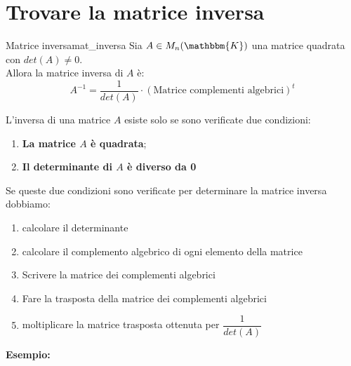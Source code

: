 \documentclass[12pt, letterpaper]{report}
\newcounter{definition}
\newcommand{\nmu}{}
\begin{document}
   		\section{Trovare la matrice inversa}
   		 \begin{definition}{\nmu Matrice inversa}{mat_inversa}
   			Sia $A \in M_n(\mathbbm{K})$ una matrice quadrata con $det(A) \neq 0$. \\
   			Allora la matrice inversa di $A$ è:
   			\[
   			A^{-1} = \dfrac{1}{det(A)} \cdot (\text{Matrice complementi algebrici})^t
   			\]
   		\end{definition}
   		L'inversa di una matrice $A$ esiste solo se sono verificate due condizioni:
   		\begin{enumerate}
   			\item \textbf{La matrice $A$ è quadrata};
   			\item \textbf{Il determinante di $A$ è diverso da 0}
   		\end{enumerate}
   		Se queste due condizioni sono verificate per determinare la matrice inversa dobbiamo:
   		\begin{enumerate}
   			\item calcolare il determinante
   			\item calcolare il complemento algebrico di ogni elemento della matrice
   			\item Scrivere la matrice dei complementi algebrici
   			\item Fare la trasposta della matrice dei complementi algebrici
   			\item moltiplicare la matrice trasposta ottenuta per $\dfrac{1}{det(A)}$
   		\end{enumerate}
   		\textbf{Esempio:}
\end{document}
